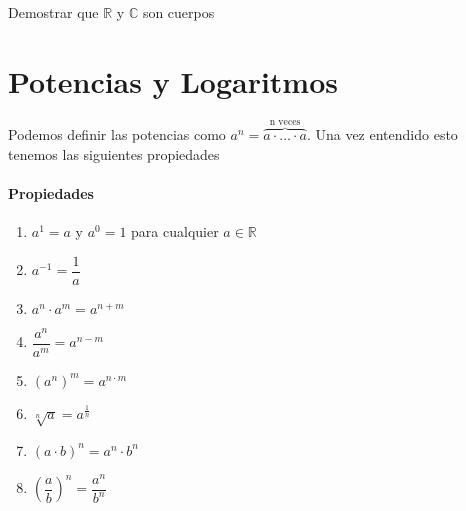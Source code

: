 \begin{ejerci}

Demostrar que $\mathbb{R}$ y $\mathbb{C}$ son cuerpos 

\end{ejerci}



\section{Potencias y Logaritmos}
\begin{defi}
Podemos definir las potencias como  $a^n=\overbrace{a \cdot\ldots \cdot a}^{\text{n veces}}$. Una vez entendido esto tenemos las siguientes propiedades
\end{defi}

\paragraph{Propiedades}
\begin{enumerate}
\item $a^1=a$ y $a^0=1$ para cualquier $a\in\mathbb{R}$
\item $a^{-1}=\dfrac{1}{a}$
\item $a^n\cdot a^m=a^{n+m}$
\item $\dfrac{a^n}{a^m}=a^{n-m} $
\item $\left( a^n \right) ^m =a^{n \cdot m}$
\item $\sqrt[n]{a}=a^{\frac{1}{n}}$
\item $(a \cdot b)^n=a^n \cdot b^n$
\item $ \left(\dfrac{a}{b}\right)^n=\dfrac{a^n}{b^n}$
\end{enumerate}

